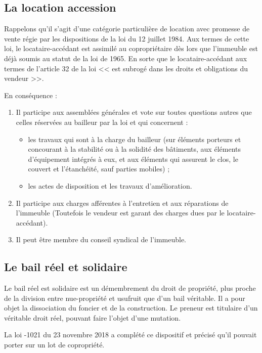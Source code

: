 	\subsection{La location accession}
	
		Rappelons qu'il s'agit d'une catégorie particulière de location avec promesse de vente régie par les dispositions de la loi du 12 juillet 1984.
		Aux termes de cette loi, le locataire-accédant est assimilé au copropriétaire dès lors que l'immeuble est déjà soumis au statut de la loi de 1965. En sorte que le locataire-accédant aux termes de l'article 32 de la loi << est subrogé dans les droits et obligations du vendeur >>.
	
		En conséquence :
		\begin{enumerate}
			\item Il participe aux assemblées générales et vote sur toutes questions autres que celles réservées au bailleur par la loi et qui concernent :
			\begin{itemize}
				\item les travaux qui sont à la charge du bailleur (sur éléments porteurs et concourant à la stabilité ou à la solidité des bâtiments, aux éléments d’équipement intégrés à eux, et aux éléments qui assurent le clos, le couvert et l’étanchéité, sauf parties mobiles) ;
				\item les actes de disposition et les travaux d’amélioration.
			\end{itemize}
			\item Il participe aux charges afférentes à l'entretien et aux réparations de l'immeuble (Toutefois le vendeur est garant des charges dues par le locataire-accédant).
			\item Il peut être membre du conseil syndical de l’immeuble.
		\end{enumerate}
	
	\subsection{Le bail réel et solidaire}
	
		Le bail réel est solidaire est un démembrement du droit de propriété, plus proche de la division entre nue-propriété et usufruit que d'un bail véritable. Il a pour objet la dissociation du foncier et de la construction. Le preneur est titulaire d'un véritable droit réel, pouvant faire l'objet d'une mutation.
		
		La loi -1021 du 23 novembre 2018 a complété ce dispositif et précisé qu’il pouvait porter sur un lot de copropriété.
		

